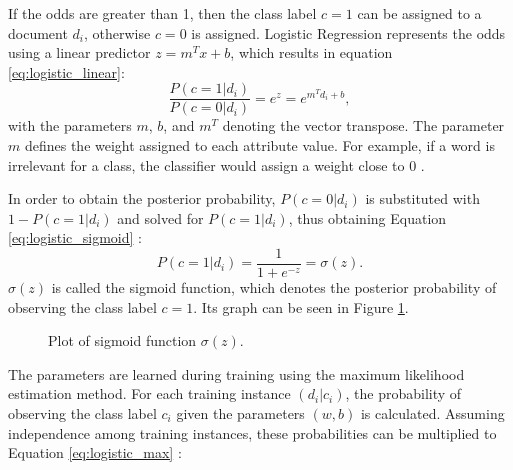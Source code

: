 If the odds are greater than 1, then the class label $c=1$ can be assigned to a document $d_i$, otherwise $c=0$ is assigned. Logistic Regression represents the odds using a linear predictor $z=m^Tx + b$, which results in equation \eqref{eq:logistic_linear}:
        \begin{equation}
            \label{eq:logistic_linear}
                \frac{P(c=1|d_i)}{P(c=0|d_i)} = e^z = e^{m^Td_i+b},
        \end{equation}
with the parameters $m$, $b$, and $m^T$ denoting the vector transpose. The parameter $m$ defines the weight assigned to each attribute value. For example, if a word is irrelevant for a class, the classifier would assign a weight close to 0 \cite{DBLP:books/aw/TanSKK2019}. 

In order to obtain the posterior probability, $P(c=0|d_i)$ is substituted with $1 - P(c=1|d_i)$ and solved for $P(c=1|d_i)$, thus obtaining Equation \eqref{eq:logistic_sigmoid} \cite{DBLP:books/aw/TanSKK2019}:
        {\begin{equation}
            \label{eq:logistic_sigmoid}
                P(c=1|d_i) = \frac{1}{1+e^{-z}} = \sigma(z).
        \end{equation}}
$\sigma(z)$ is called the sigmoid function, which denotes the posterior probability of observing the class label $c=1$. Its graph can be seen in Figure \ref{fig:sigmoid}.
        \begin{figure}
        \centering

    \caption{Plot of sigmoid function $\sigma(z)$.}
      \label{fig:sigmoid}
\end{figure}
The parameters are learned during training using the maximum likelihood estimation method. For each training instance $(d_i|c_i)$, the probability of observing the class label $c_i$ given the parameters $(w,b)$ is calculated. Assuming independence among training instances, these probabilities can be multiplied to Equation \eqref{eq:logistic_max} \cite{DBLP:books/aw/TanSKK2019}:
